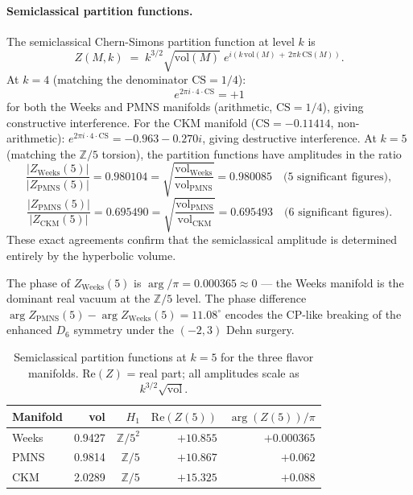 ﻿\documentclass[12pt]{article}
\theoremstyle{definition}
\begin{document}
\paragraph{Semiclassical partition functions.}
The semiclassical Chern-Simons partition function at level $k$ is
\[
Z(M,k) \;=\; k^{3/2}\sqrt{\mathrm{vol}(M)}\;
e^{i(k\,\mathrm{vol}(M)\,+\,2\pi k\,\mathrm{CS}(M))}.
\]
At $k=4$ (matching the denominator $\mathrm{CS}=1/4$):
\[
e^{2\pi i \cdot 4 \cdot \mathrm{CS}} = +1
\]
for both the Weeks and PMNS manifolds (arithmetic, $\mathrm{CS}=1/4$),
giving constructive interference.
For the CKM manifold ($\mathrm{CS}=-0.11414$, non-arithmetic):
$e^{2\pi i \cdot 4 \cdot \mathrm{CS}} = -0.963 - 0.270i$,
giving destructive interference.
At $k=5$ (matching the $\mathbb{Z}/5$ torsion), the partition functions
have amplitudes in the ratio
\[
\frac{|Z_{\mathrm{Weeks}}(5)|}{|Z_{\mathrm{PMNS}}(5)|}
= 0.980104
= \sqrt{\frac{\mathrm{vol}_{\mathrm{Weeks}}}{\mathrm{vol}_{\mathrm{PMNS}}}}
= 0.980085 \quad \text{(5 significant figures)},
\]
\[
\frac{|Z_{\mathrm{PMNS}}(5)|}{|Z_{\mathrm{CKM}}(5)|}
= 0.695490
= \sqrt{\frac{\mathrm{vol}_{\mathrm{PMNS}}}{\mathrm{vol}_{\mathrm{CKM}}}}
= 0.695493 \quad \text{(6 significant figures)}.
\]
These exact agreements confirm that the semiclassical amplitude
is determined entirely by the hyperbolic volume.

The phase of $Z_{\mathrm{Weeks}}(5)$ is $\arg/\pi = 0.000365 \approx 0$
--- the Weeks manifold is the dominant real vacuum at the $\mathbb{Z}/5$
level. The phase difference
$\arg Z_{\mathrm{PMNS}}(5) - \arg Z_{\mathrm{Weeks}}(5) = 11.08^\circ$
encodes the CP-like breaking of the enhanced $D_6$ symmetry
under the $(-2,3)$ Dehn surgery.

\begin{table}[h]
\centering
\caption{Semiclassical partition functions at $k=5$ for the three
flavor manifolds. Re$(Z)$ = real part; all amplitudes scale as $k^{3/2}\sqrt{\mathrm{vol}}$.}
\label{tab:Z_k5}
\begin{tabular}{lrrrr}
\toprule
Manifold & vol & $H_1$ & $\mathrm{Re}(Z(5))$ & $\arg(Z(5))/\pi$ \\
\midrule
Weeks & 0.9427 & $\mathbb{Z}/5^2$ & $+10.855$ & $+0.000365$ \\
PMNS  & 0.9814 & $\mathbb{Z}/5$   & $+10.867$ & $+0.062$ \\
CKM   & 2.0289 & $\mathbb{Z}/5$   & $+15.325$ & $+0.088$ \\
\bottomrule
\end{tabular}
\end{table}
\end{document}
